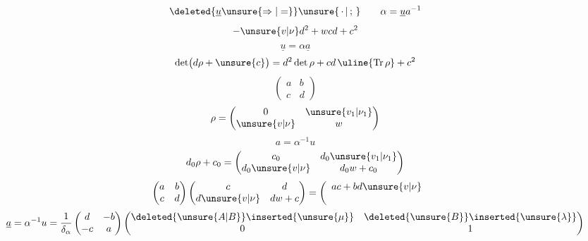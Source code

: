 
\[
\deleted{\underline{u}\unsure{\Rightarrow|=}}\unsure{\,\cdot\,|\,;\,}
\qquad \alpha=\underline{u}a^{-1}
\]
\[
-\unsure{v|\nu}d^2+wcd+c^2
\]
\[
\underline{u}=\alpha\underline{a}
\]
\[
\det\bigl(d\rho+\unsure{c}\bigr)
=d^2\det\rho+cd\,\uline{\operatorname{Tr}\rho}+c^2
\]
\[
\begin{pmatrix}a&b\\c&d\end{pmatrix}
\]
\[
\rho=\begin{pmatrix}0&\unsure{v_1|\nu_1}\\\unsure{v|\nu}&w\end{pmatrix}
\]
\[
a=\alpha^{-1}u
\]
\[
d_0\rho+c_0=
\begin{pmatrix}
c_0&d_0\unsure{v_1|\nu_1}\\
d_0\unsure{v|\nu}&d_0w+c_0
\end{pmatrix}
\]
\[
\begin{pmatrix}a&b\\c&d\end{pmatrix}
\begin{pmatrix}c&d\\d\unsure{v|\nu}&dw+c\end{pmatrix}
=\left(\begin{array}{cc}ac+bd\unsure{v|\nu}&\\&\end{array}\right.
\]
\[
\underline{a}=\alpha^{-1}u
=\frac{1}{\delta_\alpha}
\begin{pmatrix}d&-b\\-c&a\end{pmatrix}
\begin{pmatrix}
\deleted{\unsure{A|B}}\inserted{\unsure{\mu}}&
\deleted{\unsure{B}}\inserted{\unsure{\lambda}}\\
0&1
\end{pmatrix}
\]
